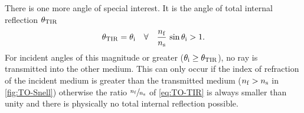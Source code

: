 There is one more angle of special interest. It is the angle of total internal 
reflection $\theta_{\mathrm{TIR}}$
\begin{equation}
  \theta_{\mathrm{TIR}}=\theta_{\mathrm{i}} \quad\forall\quad \frac{n_{\mathrm{f}}}{n_{\mathrm{s}}}\,\sin\theta_{\mathrm{i}} 
  > 1.
  \label{eq:TO-TIR}
\end{equation}
For incident angles of this magnitude or greater 
($\theta_{\mathrm{i}}\geq\theta_{\mathrm{TIR}}$), no ray is transmitted into the other 
medium. This can only occur if the index of refraction of the incident medium 
is greater than the transmitted medium ($n_{\mathrm{f}}>n_{\mathrm{s}}$ in \cref{fig:TO-Snell}) 
otherwise the ratio $\sfrac{n_{\mathrm{f}}}{n_{\mathrm{s}}}$ of \cref{eq:TO-TIR} is always smaller 
than unity and there is physically no total internal reflection possible.


